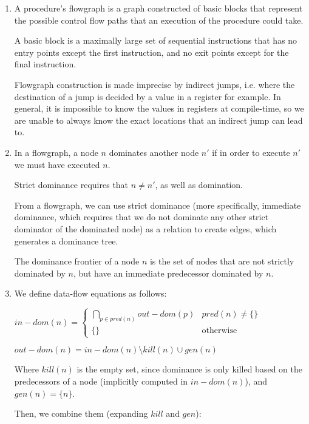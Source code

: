 


\begin{enumerate}[label=(\alph*)]

  \item
    A procedure's flowgraph is a graph constructed of basic blocks that represent the possible control flow paths that an execution of the procedure could take.

    A basic block is a maximally large set of sequential instructions that has no entry points except the first instruction, and no exit points except for the final instruction.

    Flowgraph construction is made imprecise by indirect jumps, i.e. where the destination of a jump is decided by a value in a register for example. In general, it is impossible to know the values in registers at compile-time, so we are unable to always know the exact locations that an indirect jump can lead to.

  \item
    In a flowgraph, a node $n$ dominates another node $n'$ if in order to execute $n'$ we must have executed $n$.

    Strict dominance requires that $n \neq n'$, as well as domination.

    From a flowgraph, we can use strict dominance (more specifically, immediate dominance, which requires that we do not dominate any other strict dominator of the dominated node) as a relation to create edges, which generates a dominance tree.

    The dominance frontier of a node $n$ is the set of nodes that are not strictly dominated by $n$, but have an immediate predecessor dominated by $n$.

  \item
    We define data-flow equations as follows:

    $in-dom(n) = \begin{cases}\bigcap_{p \in pred(n)} out-dom(p) & pred(n) \neq \{\}\\\{\} & \text{otherwise}\end{cases}$

    $out-dom(n) = in-dom(n) \setminus kill(n) \cup gen(n)$

    Where $kill(n)$ is the empty set, since dominance is only killed based on the predecessors of a node (implicitly computed in $in-dom(n)$), and $gen(n) = \{n\}$.

    Then, we combine them (expanding $kill$ and $gen$):


\end{enumerate}
